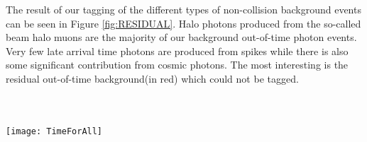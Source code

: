 \vspace{5mm}
The result of our tagging of the different types of non-collision background events can be seen in Figure \ref{fig:RESIDUAL}. Halo photons produced from the so-called beam halo muons are the majority of our background out-of-time photon events. Very few late arrival time photons are produced from spikes while there is also some significant contribution from cosmic photons. The most interesting is the residual out-of-time background(in red) which could not be tagged. 

\paragraph*{}\mbox{}\\
\begin{minipage}{0.90\linewidth} 
\begin{center}
  \captionsetup{type=figure}
   \texttt{[image: TimeForAll]}
   \label{fig:RESIDUAL}
\end{center}
\end{minipage}

